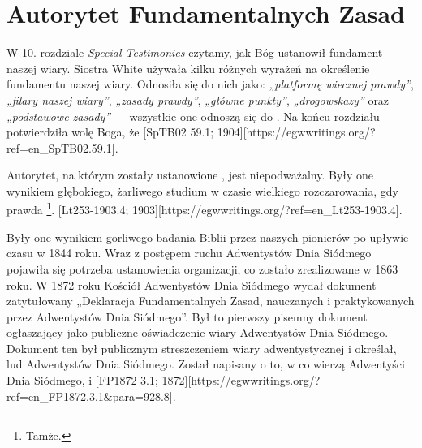 \chapter{Autorytet Fundamentalnych Zasad} \label{chap:authority}

W 10. rozdziale \textit{Special Testimonies} czytamy, jak Bóg ustanowił fundament naszej wiary. Siostra White używała kilku różnych wyrażeń na określenie fundamentu naszej wiary. Odnosiła się do nich jako: \textit{„platformę wiecznej prawdy”}, \textit{„filary naszej wiary”}, \textit{„zasady prawdy”}, \textit{„główne punkty”}, \textit{„drogowskazy”} oraz \textit{„podstawowe zasady”} — wszystkie one odnoszą się do . Na końcu rozdziału potwierdziła wolę Boga, że [SpTB02 59.1; 1904][https://egwwritings.org/?ref=en\_SpTB02.59.1].

Autorytet, na którym zostały ustanowione , jest niepodważalny. Były one wynikiem głębokiego, żarliwego studium w czasie wielkiego rozczarowania, gdy prawda \footnote{Tamże.}. [Lt253-1903.4; 1903][https://egwwritings.org/?ref=en\_Lt253-1903.4].

Były one wynikiem gorliwego badania Biblii przez naszych pionierów po upływie czasu w 1844 roku. Wraz z postępem ruchu Adwentystów Dnia Siódmego pojawiła się potrzeba ustanowienia organizacji, co zostało zrealizowane w 1863 roku. W 1872 roku Kościół Adwentystów Dnia Siódmego wydał dokument zatytułowany „Deklaracja Fundamentalnych Zasad, nauczanych i praktykowanych przez Adwentystów Dnia Siódmego”. Był to pierwszy pisemny dokument ogłaszający  jako publiczne oświadczenie wiary Adwentystów Dnia Siódmego. Dokument ten był publicznym streszczeniem wiary adwentystycznej i określał,  lud Adwentystów Dnia Siódmego. Został napisany  o to, w co wierzą Adwentyści Dnia Siódmego,  i [FP1872 3.1; 1872][https://egwwritings.org/?ref=en\_FP1872.3.1&para=928.8].

